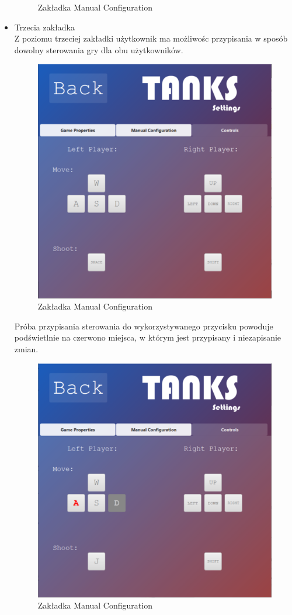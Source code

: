 \documentclass[11pt,a4paper]{report}
\begin{document}
\begin{itemize}
\begin{figure}[!ht]
\caption{Zakładka Manual Configuration }
\end{figure}
\newpage
\item{Trzecia zakładka}\\
Z poziomu trzeciej zakładki użytkownik ma możliwośc przypisania w sposób dowolny sterowania gry dla obu użytkowników.
\begin{figure}[!ht]
\centerline{\includegraphics{img/zakladka3.png}}
\caption{Zakładka Manual Configuration }
\end{figure}
\newpage
Próba przypisania sterowania do wykorzystywanego przycisku powoduje podświetlnie na czerwono miejsca, w którym jest przypisany i niezapisanie zmian.
\begin{figure}[!ht]
\centerline{\includegraphics{img/zakladka3.1.png}}
\caption{Zakładka Manual Configuration }
\end{figure}
\newpage

\end{itemize}
\end{document}
